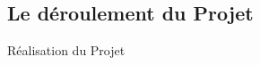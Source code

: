\documentclass[12pt]{beamer}
\begin{document}
\subsection{Le déroulement du Projet}
\begin{frame}{Réalisation du Projet}
\end{frame}
\begin{frame}
\end{frame}
\begin{frame}
\end{frame}
\end{document}
